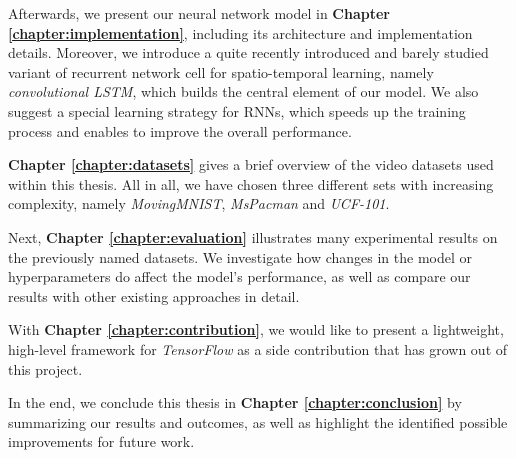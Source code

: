 Afterwards, we present our neural network model in \textbf{Chapter \ref{chapter:implementation}}, including its architecture and implementation details. Moreover, we introduce a quite recently introduced and barely studied variant of recurrent network cell for spatio-temporal learning, namely \textit{convolutional LSTM}, which builds the central element of our model. We also suggest a special learning strategy for RNNs, which speeds up the training process and enables to improve the overall performance.

\textbf{Chapter \ref{chapter:datasets}} gives a brief overview of the video datasets used within this thesis. All in all, we have chosen three different sets with increasing complexity, namely \textit{MovingMNIST}, \textit{MsPacman} and \textit{UCF-101}.

Next, \textbf{Chapter \ref{chapter:evaluation}} illustrates many experimental results on the previously named datasets. We investigate how changes in the model or hyperparameters do affect the model's performance, as well as compare our results with other existing approaches in detail.

With \textbf{Chapter \ref{chapter:contribution}}, we would like to present a lightweight, high-level framework for \textit{TensorFlow} as a side contribution that has grown out of this project.

In the end, we conclude this thesis in \textbf{Chapter \ref{chapter:conclusion}} by summarizing our results and outcomes, as well as highlight the identified possible improvements for future work.



